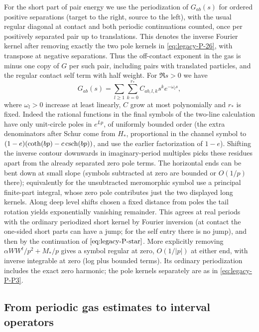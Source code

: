 For the short part of pair energy we use the periodization of \(G_{ab}(s)\) for ordered positive separations (target to the right, source to the left), with the usual regular diagonal at contact and both periodic continuations counted, once per positively separated pair up to translations. This denotes the inverse Fourier kernel after removing exactly the two pole kernels in \eqref{eq:legacy-P-26}, with transpose at negative separations. Thus the off-contact exponent in the gas is minus one copy of \(G\) per such pair, including pairs with translated particles, and the regular contact self term with half weight. For \(\Re s>0\) we have
\begin{equation}
 G_{ab}(s)=\sum_{l\ge1}\sum_{k=0}^{r_*} C_{ab,l,k}s^k e^{-\omega_l s},
 \label{eq:legacy-P-28}
\end{equation}
where \(\omega_l>0\) increase at least linearly, \(C\) grow at most polynomially and \(r_*\) is fixed. Indeed the rational functions in the final symbols of the two-line calculation have only unit-circle poles in \(e^{Lp}\), of uniformly bounded order (the extra denominators after Schur come from \(H_*\), proportional in the channel symbol to \((1-e)(\coth(bp)-c\,{\rm csch}(bp))\), and use the earlier factorization of \(1-e\)). Shifting the inverse contour downwards in imaginary-period multiples picks these residues apart from the already separated zero pole terms. The horizontal ends can be bent down at small slope (symbols subtracted at zero are bounded or \(O(1/p)\) there); equivalently for the unsubtracted meromorphic symbol use a principal finite-part integral, whose zero pole contributes just the two displayed long kernels. Along deep level shifts chosen a fixed distance from poles the tail rotation yields exponentially vanishing remainder. This agrees at real periods with the ordinary periodized short kernel by Fourier inversion (at contact the one-sided short parts can have a jump; for the self entry there is no jump), and then by the continuation of \(\eqref{eq:legacy-P-star}\). More explicitly removing \(\alpha WW^t/p^2+M_*/p\) gives a symbol regular at zero, \(O(1/|p|)\) at either end, with inverse integrable at zero (log plus bounded terms). Its ordinary periodization includes the exact zero harmonic; the pole kernels separately are as in \eqref{eq:legacy-P-P3}.



\subsection{From periodic gas estimates to interval operators}
\label{u:interval-operator}

